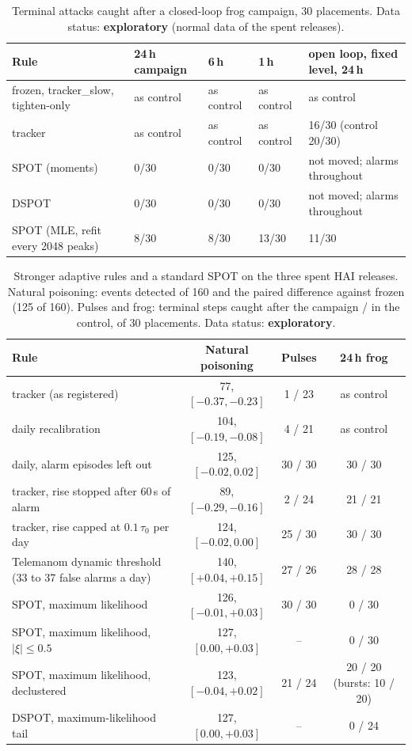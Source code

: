 \documentclass[letterpaper,twocolumn,10pt]{article}
\begin{document}
\begin{table}[t]
\caption{Terminal attacks caught after a closed-loop frog campaign, 30 placements. Data status:
\textbf{exploratory} (normal data of the spent releases).}
\label{tab:frog}
\begin{tabular}{@{}lllll@{}}
\toprule
Rule & 24\,h campaign & 6\,h & 1\,h & open loop, fixed level, 24\,h \\
\midrule
frozen, tracker\_slow, tighten-only & as control & as control & as control & as control \\
tracker & as control & as control & as control & 16/30 (control 20/30) \\
SPOT (moments) & 0/30 & 0/30 & 0/30 & not moved; alarms throughout \\
DSPOT & 0/30 & 0/30 & 0/30 & not moved; alarms throughout \\
SPOT (MLE, refit every 2048 peaks) & 8/30 & 8/30 & 13/30 & 11/30 \\
\bottomrule
\end{tabular}
\end{table}

\begin{table}[t]
\caption{Stronger adaptive rules and a standard SPOT on the three spent HAI releases. Natural poisoning:
events detected of 160 and the paired difference against frozen (125 of 160). Pulses and frog: terminal
steps caught after the campaign / in the control, of 30 placements. Data status: \textbf{exploratory}.}
\label{tab:stronger}
\begin{tabularx}{\textwidth}{@{}Lccc@{}}
\toprule
Rule & Natural poisoning & Pulses & 24\,h frog \\
\midrule
tracker (as registered) & 77, $[-0.37, -0.23]$ & 1 / 23 & as control \\
daily recalibration & 104, $[-0.19, -0.08]$ & 4 / 21 & as control \\
daily, alarm episodes left out & 125, $[-0.02, 0.02]$ & 30 / 30 & 30 / 30 \\
tracker, rise stopped after 60\,s of alarm & 89, $[-0.29, -0.16]$ & 2 / 24 & 21 / 21 \\
tracker, rise capped at $0.1\,\tau_0$ per day & 124, $[-0.02, 0.00]$ & 25 / 30 & 30 / 30 \\
Telemanom dynamic threshold (33 to 37 false alarms a day) & 140, $[+0.04, +0.15]$ & 27 / 26 & 28 / 28 \\
SPOT, maximum likelihood & 126, $[-0.01, +0.03]$ & 30 / 30 & 0 / 30 \\
SPOT, maximum likelihood, $|\xi| \le 0.5$ & 127, $[0.00, +0.03]$ & -- & 0 / 30 \\
SPOT, maximum likelihood, declustered & 123, $[-0.04, +0.02]$ & 21 / 24 & 20 / 20 (bursts: 10 / 20) \\
DSPOT, maximum-likelihood tail & 127, $[0.00, +0.03]$ & -- & 0 / 24 \\
\bottomrule
\end{tabularx}
\end{table}
\end{document}
